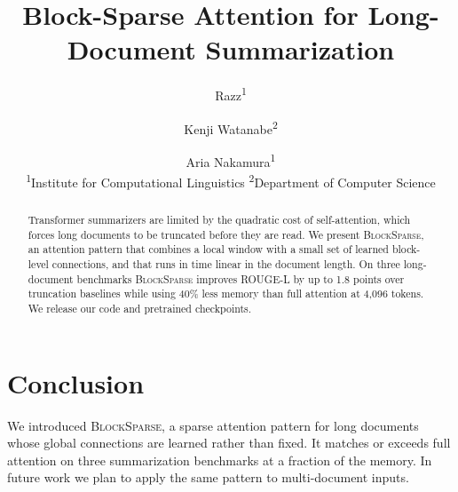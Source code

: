 \documentclass[10pt,twocolumn]{article}
\title{Block-Sparse Attention for Long-Document Summarization}
\author{
  Razz\textsuperscript{1} \and Kenji Watanabe\textsuperscript{2} \and Aria Nakamura\textsuperscript{1} \\[4pt]
  \textsuperscript{1}Institute for Computational Linguistics \quad \textsuperscript{2}Department of Computer Science
}
\date{}
\newcommand{\model}{\textsc{BlockSparse}}
\begin{document}
\maketitle

\begin{abstract}
Transformer summarizers are limited by the quadratic cost of self-attention, which forces long documents to be truncated before they are read. We present \model{}, an attention pattern that combines a local window with a small set of learned block-level connections, and that runs in time linear in the document length. On three long-document benchmarks \model{} improves ROUGE-L by up to 1.8 points over truncation baselines while using 40\% less memory than full attention at 4{,}096 tokens. We release our code and pretrained checkpoints.
\end{abstract}






\section{Conclusion}

We introduced \model{}, a sparse attention pattern for long documents whose global connections are learned rather than fixed. It matches or exceeds full attention on three summarization benchmarks at a fraction of the memory. In future work we plan to apply the same pattern to multi-document inputs.



\end{document}
